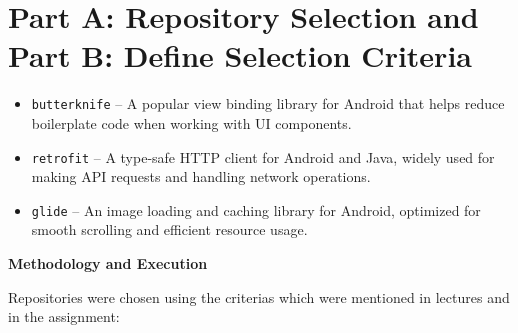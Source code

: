 \documentclass[12pt, a4paper]{report}
\newcommand{\sectionbar}[1]{%
  \vspace{0.6\baselineskip}%
  \noindent
  \colorbox{sectionbar}{%
    \parbox{\dimexpr\linewidth-2\fboxsep\relax}{%
      \textbf{\Large\textsf{#1}}%
    }%
  }%
  \vspace{0.6\baselineskip}
}
\begin{document}
\section{Part A: Repository Selection and Part B: Define Selection Criteria}

\begin{itemize}
    \item \texttt{butterknife} -- A popular view binding library for Android that helps reduce boilerplate code when working with UI components. 
    \item \texttt{retrofit} -- A type-safe HTTP client for Android and Java, widely used for making API requests and handling network operations.
    \item \texttt{glide} -- An image loading and caching library for Android, optimized for smooth scrolling and efficient resource usage.
\end{itemize}

\sectionbar{Methodology and Execution}

Repositories were chosen using the criterias which were mentioned in lectures and in the assignment:
\end{document}
